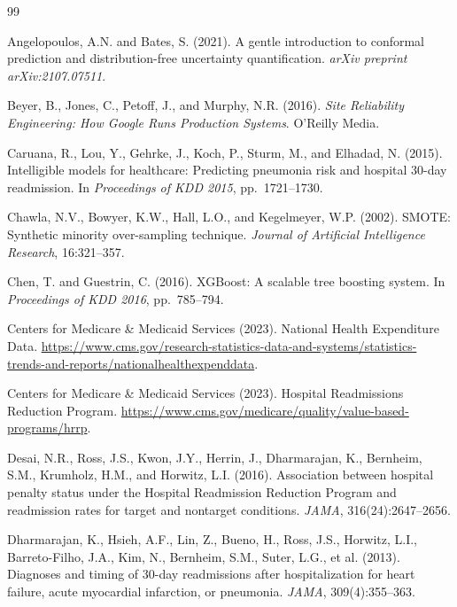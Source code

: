 \documentclass[11pt,letterpaper]{article}
\begin{document}


\begin{thebibliography}{99}

Angelopoulos, A.N. and Bates, S. (2021).
\newblock A gentle introduction to conformal prediction and distribution-free uncertainty quantification.
\newblock \textit{arXiv preprint arXiv:2107.07511}.

Beyer, B., Jones, C., Petoff, J., and Murphy, N.R. (2016).
\newblock \textit{Site Reliability Engineering: How Google Runs Production Systems}.
\newblock O'Reilly Media.

Caruana, R., Lou, Y., Gehrke, J., Koch, P., Sturm, M., and Elhadad, N. (2015).
\newblock Intelligible models for healthcare: Predicting pneumonia risk and hospital 30-day readmission.
\newblock In \textit{Proceedings of KDD 2015}, pp.\ 1721--1730.

Chawla, N.V., Bowyer, K.W., Hall, L.O., and Kegelmeyer, W.P. (2002).
\newblock SMOTE: Synthetic minority over-sampling technique.
\newblock \textit{Journal of Artificial Intelligence Research}, 16:321--357.

Chen, T. and Guestrin, C. (2016).
\newblock XGBoost: A scalable tree boosting system.
\newblock In \textit{Proceedings of KDD 2016}, pp.\ 785--794.

Centers for Medicare \& Medicaid Services (2023).
\newblock National Health Expenditure Data.
\newblock \url{https://www.cms.gov/research-statistics-data-and-systems/statistics-trends-and-reports/nationalhealthexpenddata}.

Centers for Medicare \& Medicaid Services (2023).
\newblock Hospital Readmissions Reduction Program.
\newblock \url{https://www.cms.gov/medicare/quality/value-based-programs/hrrp}.

Desai, N.R., Ross, J.S., Kwon, J.Y., Herrin, J., Dharmarajan, K., Bernheim, S.M., Krumholz, H.M., and Horwitz, L.I. (2016).
\newblock Association between hospital penalty status under the Hospital Readmission Reduction Program and readmission rates for target and nontarget conditions.
\newblock \textit{JAMA}, 316(24):2647--2656.

Dharmarajan, K., Hsieh, A.F., Lin, Z., Bueno, H., Ross, J.S., Horwitz, L.I., Barreto-Filho, J.A., Kim, N., Bernheim, S.M., Suter, L.G., et al. (2013).
\newblock Diagnoses and timing of 30-day readmissions after hospitalization for heart failure, acute myocardial infarction, or pneumonia.
\newblock \textit{JAMA}, 309(4):355--363.


\end{thebibliography}
\end{document}
